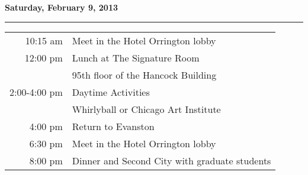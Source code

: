 \documentclass{article}
\begin{document}
\vspace*{1.5\baselineskip}
\centerline{\textbf{Saturday, February 9, 2013}}
\vspace*{0.25\baselineskip}
\hrule
\vspace*{0.25\baselineskip}

\hspace{5cm}
\begin{tabular}{ r    l }

10:15 am        & Meet in the Hotel Orrington lobby \rule{0cm}{0.6cm} \\ 

12:00 pm        & Lunch at The Signature Room \rule{0cm}{0.4cm} \\ 
                & \hspace{5mm} 95th floor of the Hancock Building \rule{0cm}{0.4cm} \\ 

2:00-4:00 pm    & Daytime Activities \rule{0cm}{0.4cm} \\ 
                & \hspace{5mm} Whirlyball or Chicago Art Institute \\ 

4:00 pm         & Return to Evanston \rule{0cm}{0.4cm} \\ 

6:30 pm         & Meet in the Hotel Orrington lobby \rule{0cm}{0.4cm} \\ 

8:00 pm         & Dinner and Second City with graduate students \rule{0cm}{0.4cm} \\

\end{tabular}
\end{document}
